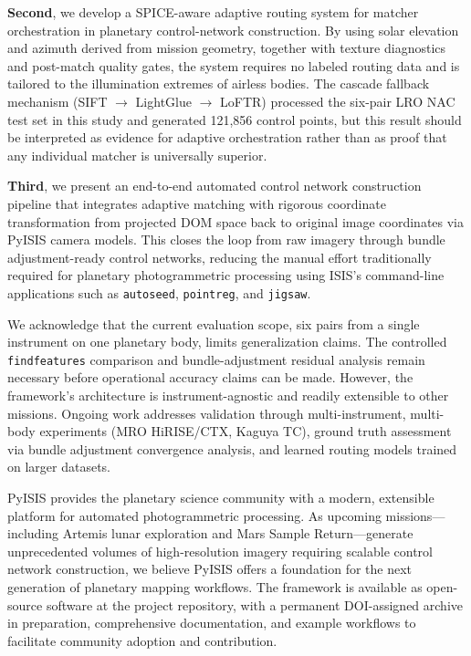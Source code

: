 \documentclass[lettersize,journal]{IEEEtran}
\newcommand{\pyisis}{PyISIS}
\begin{document}
\textbf{Second}, we develop a SPICE-aware adaptive routing system for matcher orchestration in planetary control-network construction. By using solar elevation and azimuth derived from mission geometry, together with texture diagnostics and post-match quality gates, the system requires no labeled routing data and is tailored to the illumination extremes of airless bodies. The cascade fallback mechanism (SIFT $\rightarrow$ LightGlue $\rightarrow$ LoFTR) processed the six-pair LRO NAC test set in this study and generated 121,856 control points, but this result should be interpreted as evidence for adaptive orchestration rather than as proof that any individual matcher is universally superior.

\textbf{Third}, we present an end-to-end automated control network construction pipeline that integrates adaptive matching with rigorous coordinate transformation from projected DOM space back to original image coordinates via \pyisis{} camera models. This closes the loop from raw imagery through bundle adjustment-ready control networks, reducing the manual effort traditionally required for planetary photogrammetric processing using ISIS's command-line applications such as \texttt{autoseed}, \texttt{pointreg}, and \texttt{jigsaw}.

We acknowledge that the current evaluation scope, six pairs from a single instrument on one planetary body, limits generalization claims. The controlled \texttt{findfeatures} comparison and bundle-adjustment residual analysis remain necessary before operational accuracy claims can be made. However, the framework's architecture is instrument-agnostic and readily extensible to other missions. Ongoing work addresses validation through multi-instrument, multi-body experiments (MRO HiRISE/CTX, Kaguya TC), ground truth assessment via bundle adjustment convergence analysis, and learned routing models trained on larger datasets.

\pyisis{} provides the planetary science community with a modern, extensible platform for automated photogrammetric processing. As upcoming missions—including Artemis lunar exploration and Mars Sample Return—generate unprecedented volumes of high-resolution imagery requiring scalable control network construction, we believe \pyisis{} offers a foundation for the next generation of planetary mapping workflows. The framework is available as open-source software at the project repository, with a permanent DOI-assigned archive in preparation, comprehensive documentation, and example workflows to facilitate community adoption and contribution.
\end{document}
